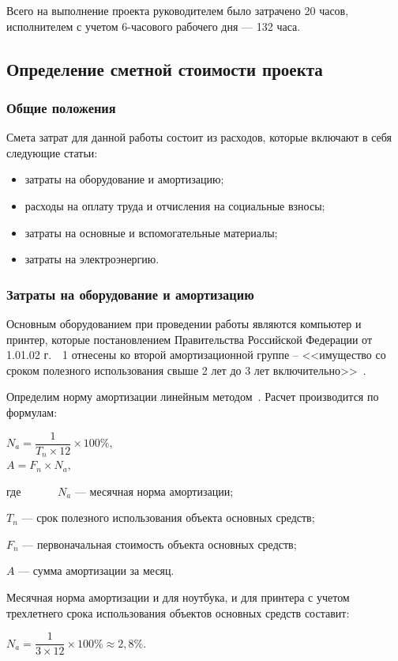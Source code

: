 Всего на выполнение проекта руководителем было затрачено 20 часов, исполнителем с учетом 6-часового
рабочего дня --- 132 часа.


\subsection{Определение сметной стоимости проекта}
\subsubsection{Общие положения}

Смета затрат для данной работы состоит из расходов, которые включают в себя следующие статьи:

\begin{itemize}
\item затраты на оборудование и амортизацию;
\item расходы на оплату труда и отчисления на социальные взносы;
\item затраты на основные и вспомогательные материалы;
\item затраты на электроэнергию.
\end{itemize}
\subsubsection{Затраты на оборудование и амортизацию}

Основным оборудованием при проведении работы являются компьютер и принтер, которые 
постановлением Правительства Российской Федерации от 1.01.02 г.~\textnumero~1 отнесены ко второй амортизационной группе – 
<<имущество со сроком полезного использования свыше 2 лет до 3 лет включительно>>~\cite{amort}. 

Определим норму амортизации линейным методом~\cite{frolova}. Расчет производится по формулам:

\begin{center}
 $ N_{a} = \dfrac{1}{T_{n}\times12}\times 100\%,$\\
 $ A = F_{n}\times N_{a}, $
\end{center}
где~~~~~ \ $N_{a}$ --- месячная норма амортизации;

$T_{n}$ --- срок полезного использования объекта основных средств;

$F_{n}$ --- первоначальная стоимость объекта основных средств;

$A$ --- сумма амортизации за месяц.

Месячная норма амортизации и для ноутбука, и для принтера с учетом трехлетнего срока 
использования объектов основных средств составит:
\begin{center}
$ N_{a} = \dfrac{1}{3\times12}\times 100\% \approx 2,8\%.$\\
\end{center}

